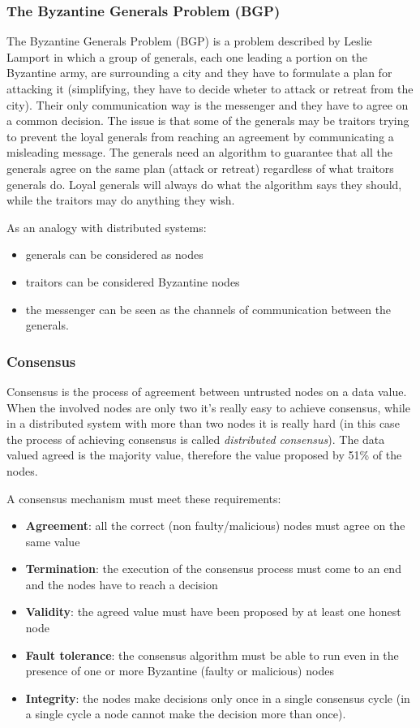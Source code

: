 \subsubsection{The Byzantine Generals Problem (BGP)}
The Byzantine Generals Problem (BGP) is a problem described by Leslie Lamport
\cite{lamport1982byzantine} in which a group of generals, each one leading a portion
on the Byzantine army, are surrounding a city and they have to formulate a plan
for attacking it (simplifying, they have to decide wheter to attack or retreat
from the city). Their only communication way is the messenger and they have to
agree on a common decision. The issue is that some of the generals may be
traitors trying to prevent the loyal generals from reaching an agreement by
communicating a misleading message. The generals need an algorithm to guarantee
that all the generals agree on the same plan (attack or retreat) regardless of what
traitors generals do. Loyal generals will always do what the algorithm says they
should, while the traitors may do anything they wish.

As an analogy with distributed systems:
\begin{itemize}
  \item generals can be considered as nodes
  \item traitors can be considered Byzantine nodes
  \item the messenger can be seen as the channels of communication between the generals.
\end{itemize}



\subsubsection{Consensus}
Consensus is the process of agreement between untrusted nodes on a data value.
When the involved nodes are only two it's really easy to achieve consensus, while
in a distributed system with more than two nodes it is really hard (in this case
the process of achieving consensus is called \emph{distributed consensus}).
The data valued agreed is the majority value, therefore the value proposed by
51\% of the nodes.

A consensus mechanism must meet these requirements:
\begin{itemize}
  \item \textbf{Agreement}: all the correct (non faulty/malicious) nodes must agree on the same value
  \item \textbf{Termination}: the execution of the consensus process must come
  to an end and the nodes have to reach a decision
  \item \textbf{Validity}: the agreed value must have been proposed by at least
  one honest node
  \item \textbf{Fault tolerance}: the consensus algorithm must be able to run even
  in the presence of one or more Byzantine (faulty or malicious) nodes
  \item \textbf{Integrity}: the nodes make decisions only once in a single
  consensus cycle (in a single cycle a node cannot make the decision more than once).
\end{itemize}



